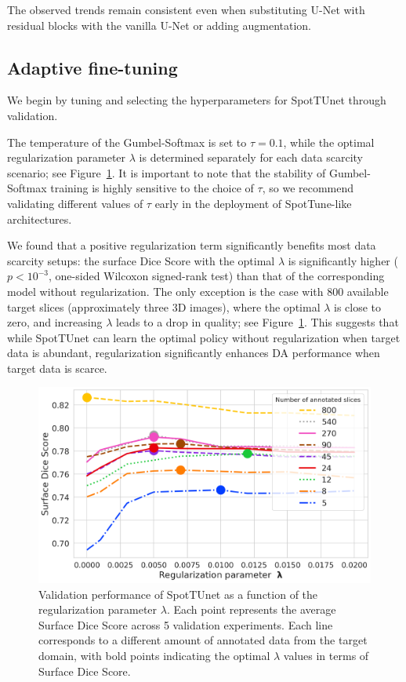 The observed trends remain consistent even when substituting U-Net with residual blocks with the vanilla U-Net or adding augmentation. %


\subsection{Adaptive fine-tuning}

We begin by tuning and selecting the hyperparameters for SpotTUnet through validation.

The temperature of the Gumbel-Softmax is set to $\tau = 0.1$, while the optimal regularization parameter $\lambda$ is determined separately for each data scarcity scenario; see Figure~\ref{fig:lambda}. It is important to note that the stability of Gumbel-Softmax training is highly sensitive to the choice of $\tau$, so we recommend validating different values of $\tau$ early in the deployment of SpotTune-like architectures.

We found that a positive regularization term significantly benefits most data scarcity setups: the surface Dice Score with the optimal $\lambda$ is significantly higher ($p < 10^{-3}$, one-sided Wilcoxon signed-rank test) than that of the corresponding model without regularization. The only exception is the case with 800 available target slices (approximately three 3D images), where the optimal $\lambda$ is close to zero, and increasing $\lambda$ leads to a drop in quality; see Figure~\ref{fig:lambda}. This suggests that while SpotTUnet can learn the optimal policy without regularization when target data is abundant, regularization significantly enhances DA performance when target data is scarce.

\begin{figure}[h!]
	\centering
	\includegraphics[width=\textwidth]{Dissertation/Figures/2_mri/k_reg.png}
	\caption{Validation performance of SpotTUnet as a function of the regularization parameter $\lambda$. Each point represents the average Surface Dice Score across 5 validation experiments. Each line corresponds to a different amount of annotated data from the target domain, with bold points indicating the optimal $\lambda$ values in terms of Surface Dice Score.}
	\label{fig:lambda}
\end{figure}

